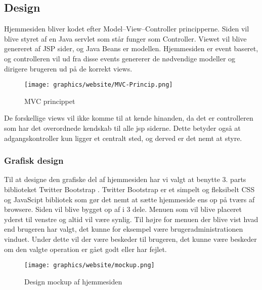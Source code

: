 \documentclass[a4paper]{article}
\newenvironment{changemargin}[2]{%
\begin{list}{}{%
\setlength{\topsep}{0pt}%
\setlength{\leftmargin}{#1}%
\setlength{\rightmargin}{#2}%
\setlength{\listparindent}{\parindent}%
\setlength{\itemindent}{\parindent}%
\setlength{\parsep}{\parskip}%
}%
\item[]}{\end{list}}
\begin{document}

\subsection{Design} %

Hjemmesiden bliver kodet efter Model–View–Controller principperne. Siden vil blive styret af en Java servlet som står funger som Controller. Viewet vil blive genereret af JSP sider, og Java Beans er modellen.  Hjemmesiden er event baseret, og controlleren vil ud fra disse events genererer de nødvendige modeller og dirigere brugeren ud på de korrekt views.

\begin{figure}[h!]
\begin{changemargin}{-2cm}{-2cm}
  \centering
  \texttt{[image: graphics/website/MVC-Princip.png]}
  \caption{MVC princippet}
\end{changemargin}
\end{figure}


De forskellige views vil ikke komme til at kende hinanden, da det er controlleren som har det overordnede kendskab til alle jsp siderne. Dette betyder også at adgangskontroller kun ligger et centralt sted, og derved er det nemt at styre.

\subsubsection{Grafisk design} %

Til at designe den grafiske del af hjemmesiden har vi valgt at benytte 3. parts biblioteket Twitter Bootstrap .  Twitter Bootstrap er et simpelt og fleksibelt CSS og JavaScipt bibliotek som gør det nemt at sætte hjemmeside ens op på tværs af browsere. Siden vil blive bygget op af i 3 dele. Menuen som vil blive placeret yderst til venstre og altid vil være synlig. Til højre for menuen der blive vist hvad end brugeren har valgt, det kunne for eksempel være brugeradministrationen vinduet. Under dette vil der være beskeder til brugeren, det kunne være beskeder om den valgte operation er gået godt eller har fejlet.

\begin{figure}[H]
  \centering
  \texttt{[image: graphics/website/mockup.png]}
  \caption{Design mockup af hjemmesiden}
\end{figure}
\end{document}
